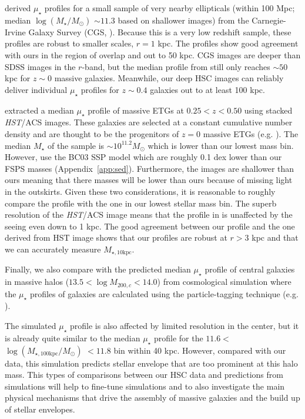 \documentclass[a4paper,fleqn,usenatbib]{mnras}
\def\mstar{{$M_{\star}$}}
\def\logms{{$\log (M_{\star}/M_{\odot})$}}
\def\minn{{$M_{\star,10\mathrm{kpc}}$}}
\def\logmtot{{$\log (M_{\star,100\mathrm{kpc}}/M_{\odot})$}}
\def\mden{{$\mu_{\star}$}}
\begin{document}
    \citet{Huang2013a} derived \mden{} profiles for a small sample of very nearby 
    ellipticals (within 100 Mpc; median \logms{} ${\sim} 11.3$ based on shallower 
    images) from the Carnegie-Irvine Galaxy Survey (CGS, \citealt{CGS1}). 
    Because this is a very low redshift sample, these profiles are robust to smaller scales, $r=1$ kpc. 
    The \citet{Huang2013a} profiles show good agreement with ours in the region of 
    overlap and out to 50 kpc. 
    CGS images are deeper than SDSS images in the $r$-band, but the median 
    profile from \citet{Huang2013a} still only reaches ${\sim} 50$ kpc for $z{\sim} 0$ 
    massive galaxies.
    Meanwhile, our deep HSC images can reliably deliver individual \mden{} profiles 
    for $z{\sim} 0.4$ galaxies out to at least 100 kpc.  
    
    \citet{Patel2013} extracted a median \mden{} profile of massive ETGs at 
    $0.25 < z < 0.50$ using stacked \textit{HST}/ACS images. 
    These galaxies are selected at a constant cumulative number density and are 
    thought to be the progenitors of $z=0$ massive ETGs (e.g. \citealt{Leja2013}).  
    The median \mstar{} of the \citet{Patel2013} sample is ${\sim} 10^{11.2} M_{\odot}$ 
    which is lower than our lowest mass bin. 
    However, \citet{Patel2013} use the BC03 SSP model which are roughly 0.1 dex 
    lower than our FSPS masses (Appendix~\ref{app:sed}). 
    Furthermore, the \citet{Patel2013} images are shallower than ours meaning 
    that there masses will be lower than ours because of missing light in the 
    outskirts. 
    Given these two considerations, it is reasonable to roughly compare the 
    \citet{Patel2013} profile with the one in our lowest stellar mass bin. 
    The superb resolution of the \textit{HST}/ACS image means that the profile in
    \citet{Patel2013} is unaffected by the seeing even down to 1 kpc. 
    The good agreement between our profile and the one derived from HST image 
    shows that our profiles are robust at $r > 3$ kpc and that we can accurately 
    measure \minn{}.
    
    Finally, we also compare with the predicted median \mden{} profile of central 
    galaxies in massive halos ($13.5 < \log M_{200,c} < 14.0$) from cosmological 
    simulation where the \mden{} profiles of galaxies are calculated using the 
    particle-tagging technique (e.g. \citealt{Cooper2010}). 
    
    The simulated \mden{} profile is also affected by limited resolution in the 
    center, but it is already quite similar to the median \mden{} profile for 
    the $11.6 <$ \logmtot{} $< 11.8$ bin within 40 kpc. 
    However, compared with our data, this simulation predicts stellar envelope that
    are too prominent at this halo mass. 
    This types of comparisons between our HSC data and predictions from simulations 
    will help to fine-tune simulations and to also investigate the main physical 
    mechanisms that drive the assembly of massive galaxies and the build up of 
    stellar envelopes.
\end{document}
